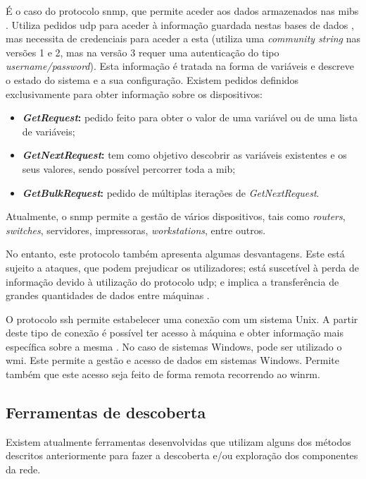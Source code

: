 \documentclass[
  oneside,
  11pt, a4paper,
  footinclude=true,
  headinclude=true,
  cleardoublepage=empty
]{scrbook}
\begin{document}
É o caso do protocolo \gls{snmp}, que permite aceder aos dados armazenados nas \glspl{mib} \cite{bearden2013network}. Utiliza pedidos \gls{udp} para aceder à informação guardada nestas bases de dados \citep{tabbara2014method}, mas necessita de credenciais para aceder a esta (utiliza uma \textit{community string} nas versões 1 e 2, mas na versão 3 requer uma autenticação do tipo \textit{username/password}). Esta informação é tratada na forma de variáveis e descreve o estado do sistema e a sua configuração. Existem pedidos definidos exclusivamente para obter informação sobre os dispositivos:
\begin{itemize}
    \item \textbf{\textit{GetRequest}:} pedido feito para obter o valor de uma variável ou de uma lista de variáveis;
    \item \textbf{\textit{GetNextRequest}:} tem como objetivo descobrir as variáveis existentes e os seus valores, sendo possível percorrer toda a \gls{mib};
    \item \textbf{\textit{GetBulkRequest}:} pedido de múltiplas iterações de \textit{GetNextRequest}.
\end{itemize}

Atualmente, o \gls{snmp} permite a gestão de vários dispositivos, tais como \textit{routers}, \textit{switches}, servidores, impressoras, \textit{workstations}, entre outros. 

No entanto, este protocolo também apresenta algumas desvantagens. Este está sujeito a ataques, que podem prejudicar os utilizadores; está suscetível à perda de informação devido à utilização do protocolo \gls{udp}; e implica a transferência de grandes quantidades de dados entre máquinas \cite{8934069}.

O protocolo \gls{ssh} permite estabelecer uma conexão com um sistema Unix. A partir deste tipo de conexão é possível ter acesso à máquina e obter informação mais específica sobre a mesma \cite{owen2019operation}. No caso de sistemas Windows, pode ser utilizado o \gls{wmi}. Este permite a gestão e acesso de dados em sistemas Windows. Permite também que este acesso seja feito de forma remota recorrendo ao \gls{winrm}.

\subsection{Ferramentas de descoberta}

Existem atualmente ferramentas desenvolvidas que utilizam alguns dos métodos descritos anteriormente para fazer a descoberta e/ou exploração dos componentes da rede.
\end{document}
